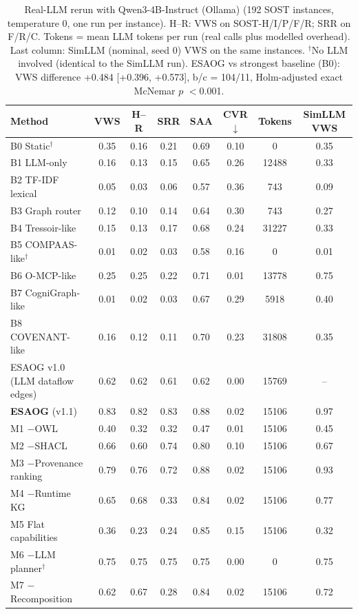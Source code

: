 \begin{table}[H]
\centering
\caption{Real-LLM rerun with Qwen3-4B-Instruct (Ollama) (192 SOST instances, temperature 0, one run per instance). H--R: VWS on SOST-H/I/P/F/R; SRR on F/R/C. Tokens = mean LLM tokens per run (real calls plus modelled overhead). Last column: SimLLM (nominal, seed 0) VWS on the same instances. $^\dagger$No LLM involved (identical to the SimLLM run). ESAOG vs strongest baseline (B0): VWS difference +0.484 [+0.396, +0.573], b/c = 104/11, Holm-adjusted exact McNemar $p$ $<$0.001.}
\label{tab:real_qwen3-4b}
\scriptsize
\begin{tabular}{lccccccc}
\toprule
Method & VWS & H--R & SRR & SAA & CVR$\downarrow$ & Tokens & SimLLM VWS\\
\midrule
B0 Static$^\dagger$ & 0.35 & 0.16 & 0.21 & 0.69 & 0.10 & 0 & 0.35\\
B1 LLM-only & 0.16 & 0.13 & 0.15 & 0.65 & 0.26 & 12488 & 0.33\\
B2 TF-IDF lexical & 0.05 & 0.03 & 0.06 & 0.57 & 0.36 & 743 & 0.09\\
B3 Graph router & 0.12 & 0.10 & 0.14 & 0.64 & 0.30 & 743 & 0.27\\
B4 Tressoir-like & 0.15 & 0.13 & 0.17 & 0.68 & 0.24 & 31227 & 0.33\\
B5 COMPAAS-like$^\dagger$ & 0.01 & 0.02 & 0.03 & 0.58 & 0.16 & 0 & 0.01\\
B6 O-MCP-like & 0.25 & 0.25 & 0.22 & 0.71 & 0.01 & 13778 & 0.75\\
B7 CogniGraph-like & 0.01 & 0.02 & 0.03 & 0.67 & 0.29 & 5918 & 0.40\\
B8 COVENANT-like & 0.16 & 0.12 & 0.11 & 0.70 & 0.23 & 31808 & 0.35\\
ESAOG v1.0 (LLM dataflow edges) & 0.62 & 0.62 & 0.61 & 0.62 & 0.00 & 15769 & --\\
\textbf{ESAOG} (v1.1) & 0.83 & 0.82 & 0.83 & 0.88 & 0.02 & 15106 & 0.97\\
M1 $-$OWL & 0.40 & 0.32 & 0.32 & 0.47 & 0.01 & 15106 & 0.45\\
M2 $-$SHACL & 0.66 & 0.60 & 0.74 & 0.80 & 0.10 & 15106 & 0.67\\
M3 $-$Provenance ranking & 0.79 & 0.76 & 0.72 & 0.88 & 0.02 & 15106 & 0.93\\
M4 $-$Runtime KG & 0.65 & 0.68 & 0.33 & 0.84 & 0.02 & 15106 & 0.77\\
M5 Flat capabilities & 0.36 & 0.23 & 0.24 & 0.85 & 0.15 & 15106 & 0.32\\
M6 $-$LLM planner$^\dagger$ & 0.75 & 0.75 & 0.75 & 0.75 & 0.00 & 0 & 0.75\\
M7 $-$Recomposition & 0.62 & 0.67 & 0.28 & 0.84 & 0.02 & 15106 & 0.72\\
\bottomrule
\end{tabular}
\end{table}
